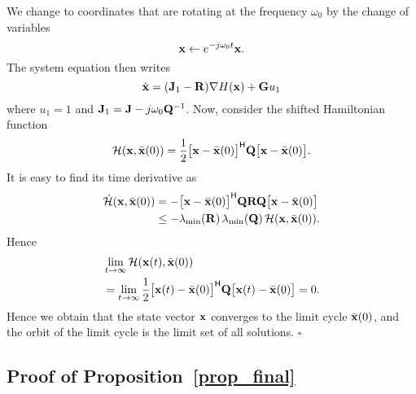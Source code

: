 We change to coordinates that are rotating at the frequency $\omega_0$ by the change of variables
\begin{equation*}
    \mathbf{x} \leftarrow e^{-j\omega_0 t} \mathbf{x}.
\end{equation*}
The system equation then writes
\begin{equation*}
    \dot{\mathbf{x}} = (\mathbf{J}_1 - \mathbf{R}) \nabla H(\mathbf{x}) + \mathbf{G} u_1
\end{equation*}
where $u_1 = 1$ and $\mathbf{J}_1 = \mathbf{J} - j \omega_0 \mathbf{Q}^{-1}$. 
Now, consider the shifted Hamiltonian function
\begin{equation*}
    \mathcal H(\mathbf{x}, \bar{\mathbf{x}}(0)) = \frac{1}{2} \big[\mathbf{x} - \bar{\mathbf{x}}(0)\big]^{\mathsf{H}} \mathbf{Q} \big[\mathbf{x} - \bar{\mathbf{x}}(0)\big].
\end{equation*}
It is easy to find its time derivative as~\cite{monshizadeh2019conditions}
\begin{align*}
    \dot{\mathcal H}(\mathbf{x}, \bar{\mathbf{x}}(0)) &= -\big[\mathbf{x} - \bar{\mathbf{x}}(0)\big]^{\mathsf{H}} \mathbf{Q} \mathbf{R} \mathbf{Q} \big[\mathbf{x} - \bar{\mathbf{x}}(0) \big] \\
    &\leq -\lambda_{\min}(\mathbf{R})\, \lambda_{\min}(\mathbf{Q})\, \mathcal H( \mathbf{x}, \bar{\mathbf{x}}(0)).
\end{align*}
Hence
\begin{align*}
    &\lim_{t\to\infty} \mathcal H(\mathbf{x}(t), \bar{\mathbf{x}}(0)) \\
    &= \lim_{t\to \infty} \frac{1}{2} \big[ \mathbf{x}(t) - \bar{\mathbf{x}}(0)\big]^{\mathsf{H}} \mathbf{Q} \big[ \mathbf{x}(t) - \bar{\mathbf{x}}(0)\big] = 0.
\end{align*}
Hence we obtain that the state vector $\mathbf{x}$ converges to the limit cycle $\bar{\mathbf{x}}(0)$, and the orbit of the limit cycle is the limit set of all solutions. \hfill $\square$

\subsection{Proof of Proposition~\ref{prop_final}}


